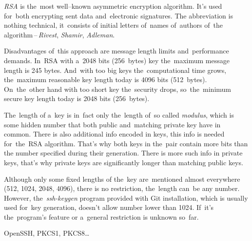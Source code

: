 \textit{RSA} is the~most well--known asymmetric encryption algorithm. It's used for~both encrypting sent data and~electronic signatures. The abbreviation is nothing technical, it~consists of initial letters of~names of~authors of~the algorithm\,--\,\textit{Rivest}, \textit{Shamir}, \textit{Adleman}.

Disadvantages of~this approach are message length limits and~performance demands. In~RSA with a~2048 bits (256~bytes) key the~maximum message length is 245 bytes. And~with too big keys the~computational time grows, the~maximum reasonable key length today is 4096 bits (512~bytes). On~the~other hand with too short key the~security drops, so~the~minimum secure key length today is 2048 bits (256~bytes).

The~length of a~key is in~fact only the~length of~so called \textit{modulus}, which is some hidden number that both public and~matching private key have in common. There is also additional info encoded in keys, this info is needed for~the~RSA algorithm. That's why both keys in the~pair contain more bits than the number specified during their generation. There is more such info in private keys, that's why private keys are significantly longer than matching public keys.

\warning Although only some fixed lengths of the~key are~mentioned almost everywhere (512, 1024, 2048, 4096), there is no restriction, the~length can~be any number. However, the~\textit{ssh-keygen} program provided with Git installation, which is usually used for~key generation, doesn't allow number lower than 1024. If~it's the~program's feature or a~general restriction is unknown so~far.

\newline\todo OpenSSH, PKCS1, PKCS8\dots

\label{electronicsignature}



